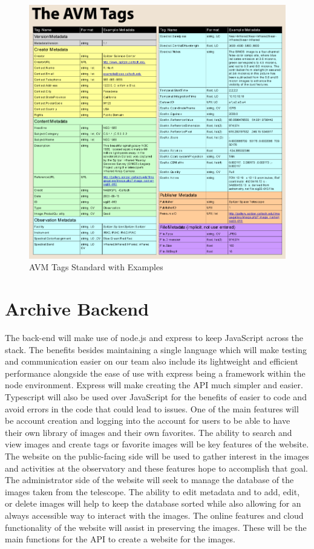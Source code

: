 \documentclass[12pt]{article}
\begin{document}
\begin{figure}[h]
	\centering
	\includegraphics[width=\linewidth]{avm_standards}
	\caption{AVM Tags Standard with Examples}
	\label{fig:AVM Standards}
\end{figure}

\newpage

\section{Archive Backend}

The back-end will make use of node.js and express to keep JavaScript across the stack.  The benefits besides maintaining a single language which will make testing and communication easier on our team also include its lightweight and efficient performance alongside the ease of use with express being a framework within the node environment.  Express will make creating the API much simpler and easier.  Typescript will also be used over JavaScript for the benefits of easier to code and avoid errors in the code that could lead to issues.
One of the main features will be account creation and logging into the account for users to be able to have their own library of images and their own favorites.  The ability to search and view images and create tags or favorite images will be key features of the website.  The website on the public-facing side will be used to gather interest in the images and activities at the observatory and these features hope to accomplish that goal.
The administrator side of the website will seek to manage the database of the images taken from the telescope.  The ability to edit metadata and to add, edit, or delete images will help to keep the database sorted while also allowing for an always accessible way to interact with the images.  The online features and cloud functionality of the website will assist in preserving the images.  These will be the main functions for the API to create a website for the images.
\end{document}
